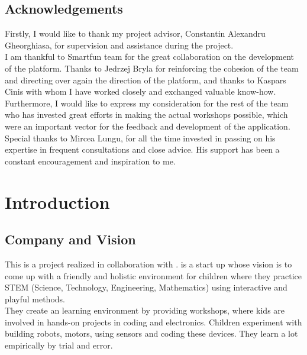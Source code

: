 
\begin{center}\section*{Acknowledgements}
\end{center}
\vspace{1.5 cm}

Firstly, I would like to thank my project advisor, Constantin Alexandru Gheorghiasa, for supervision and assistance during the project. \\

I am thankful to Smartfun team for the great collaboration on the development of the platform. Thanks to Jedrzej Bryla for reinforcing the cohesion of the team and directing over again the direction of the platform, and thanks to Kaspars Cinis with whom I have worked closely and exchanged valuable know-how. Furthermore, I would like to express my consideration for the rest of the team who has invested great efforts in making the actual workshops possible, which were an important vector for the feedback and development of the application. \\

Special thanks to Mircea Lungu, for all the time invested in passing on his expertise in frequent consultations and close advice. His support has been a constant encouragement and inspiration to me. \\ 
	
\chapter{Introduction}

\section{Company and Vision}

This is a project realized in collaboration with \sfun. \sfun is a start up whose vision is to come up with a friendly and holistic environment for children where they practice STEM (Science, Technology, Engineering, Mathematics) using interactive and playful methods. \\

They create an learning environment by providing workshops, where kids are involved in hands-on projects in coding and electronics. Children experiment with building robots, motors, using sensors and coding these devices. They learn a lot empirically by trial and error.  \\

